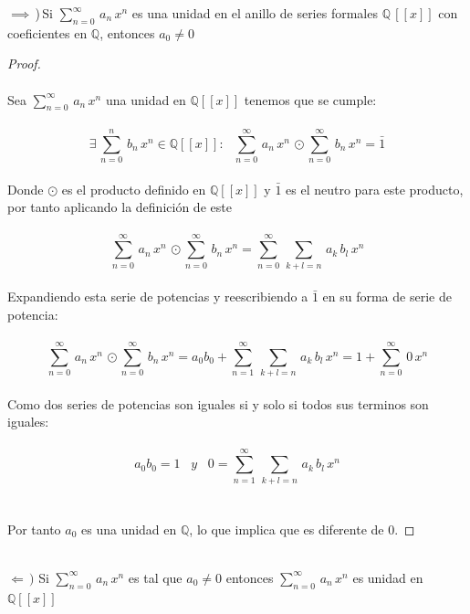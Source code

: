\documentclass[11pt,letterpaper]{article}
\newcommand{\Q}{\mathbb{Q}}
\begin{document}
    $\implies$\,)\,Si $\displaystyle \sum_{n=0}^{\infty}\,a_n\,x^n$ es una unidad en el anillo de series formales $\Q\,[[x]]$
con coeficientes en $\Q$, entonces $a_0\neq 0$\,\\
\begin{proof}\,\\
    \,\\
    Sea  $\displaystyle \sum_{n=0}^{\infty}\,a_n\,x^n$ una unidad en $\Q[[x]]$ tenemos que se cumple:\,\\
    \,\\
    \begin{equation*}
      \exists\,\sum_{n=0}^{n}\,b_n\,x^n\in \Q[[x]]:\,\,\,\,\sum_{n=0}^{\infty}\,a_n\,x^n\,\odot \sum_{n=0}^{\infty}\,b_n\,x^n=\bar{1}
    \end{equation*}\,\\
    Donde $\odot$ es el producto definido en $\Q[[x]]$ y $\bar{1}$ es el neutro para este producto, por tanto aplicando la definici\'on de este\,\\
    \,\\
    \begin{equation*}
        \sum_{n=0}^{\infty}\,a_n\,x^n\,\odot \sum_{n=0}^{\infty}\,b_n\,x^n=\sum_{n=0}^{\infty}\,\sum_{k+l=n}\,a_k\,b_l\,x^n
    \end{equation*}\,\\
    Expandiendo esta serie de potencias y reescribiendo a $\bar{1}$ en su forma de serie de potencia:\,\\
    \,\\
    \begin{equation*}
        \sum_{n=0}^{\infty}\,a_n\,x^n\,\odot \sum_{n=0}^{\infty}\,b_n\,x^n=a_0b_0+\sum_{n=1}^{\infty}\,\sum_{k+l=n}\,a_k\,b_l\,x^n=1+\sum_{n=0}^{\infty}\,0\,x^n
    \end{equation*}\,\\
    Como dos series de potencias son iguales si y solo si todos sus terminos son iguales:\,\\
    \,\\
    \begin{equation*}
        a_0b_0=1\,\,\,\,\,y\,\,\,\,\,0=\sum_{n=1}^{\infty}\,\sum_{k+l=n}\,a_k\,b_l\,x^n
    \end{equation*}\,\\
    \,\\
    Por tanto $a_0$ es una unidad en $\Q$, lo que implica que es diferente de $0$.
\end{proof}\,\\
$\Leftarrow\,)$\,\,Si $\displaystyle \sum_{n=0}^{\infty}\,a_n\,x^n$ es tal que $a_0\neq 0$ entonces $\displaystyle \sum_{n=0}^{\infty}\,a_n\,x^n$ es unidad en $\Q[[x]]$\,\\
\end{document}
